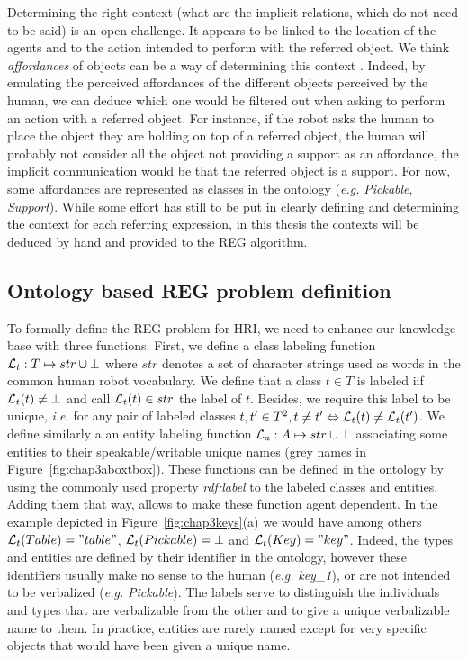 \documentclass[a4paper,11pt,twoside]{StyleThese}
\begin{document}
\begin{enumerate}
Determining the right context (what are the implicit relations, which do not need to be said) is an open challenge. It appears to be linked to the location of the agents and to the action intended to perform with the referred object. We think \textit{affordances} of objects can be a way of determining this context \cite{gibson2014ecological, norman2013design}. Indeed, by emulating the perceived affordances of the different objects perceived by the human, we can deduce which one would be filtered out when asking to perform an action with a referred object. For instance, if the robot asks the human to place the object they are holding on top of a referred object, the human will probably not consider all the object not providing a support as an affordance, the implicit communication would be that the referred object is a support. For now, some affordances are represented as classes in the ontology (\textit{e.g.} \textit{Pickable}, \textit{Support}). While some effort has still to be put in clearly defining and determining the context for each referring expression, in this thesis the contexts will be deduced by hand and provided to the REG algorithm.

\end{enumerate}

\subsection{Ontology based REG problem definition}
To formally define the REG problem for HRI, we need to enhance our knowledge base with three functions.
First, we define a class labeling function $\mathcal{L}_t: T \mapsto str \cup \bot$ where $str$ denotes a set of character strings used as words in the common human robot vocabulary. We define that a class $t \in T$ is labeled iif $\mathcal{L}_t(t) \neq \bot$ and call $\mathcal{L}_t(t) \in str$ the label of $t$. Besides, we require this label to be unique, \textit{i.e.} for any pair of labeled classes $t, t' \in T^2, t \neq t' \Leftrightarrow \mathcal{L}_t(t) \neq \mathcal{L}_t(t')$. We define similarly a an entity labeling function $\mathcal{L}_a: A \mapsto str \cup \bot$ associating some entities to their speakable/writable unique names (grey names in Figure~\ref{fig:chap3aboxtbox}). These functions can be defined in the ontology by using the commonly used property \textit{rdf:label} to the labeled classes and entities. Adding them that way, allows to make these function agent dependent. In the example depicted in Figure~\ref{fig:chap3keys}(a) we would have among others $\mathcal{L}_t(Table) = "table"$, $\mathcal{L}_t(Pickable) = \bot$ and $\mathcal{L}_t(Key) = "key"$. Indeed, the types and entities are defined by their identifier in the ontology, however these identifiers usually make no sense to the human (\textit{e.g.} \textit{key\_1}), or are not intended to be verbalized (\textit{e.g.} \textit{Pickable}). The labels serve to distinguish the individuals and types that are verbalizable from the other and to give a unique verbalizable name to them. In practice, entities are rarely named except for very specific objects that would have been given a unique name.
\end{document}
